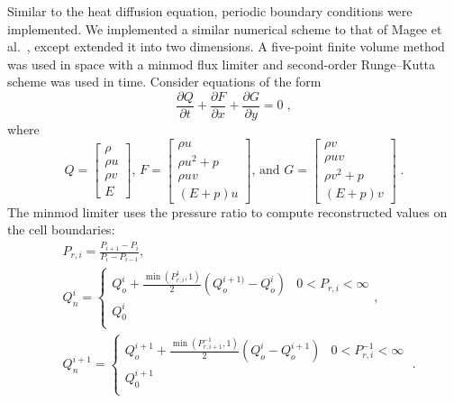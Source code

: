 \documentclass[preprints,article,accept,moreauthors,pdftex]{Definitions/mdpi}
\begin{document}
Similar to the heat diffusion equation, periodic boundary conditions were implemented. 
We implemented a similar numerical scheme to that of Magee et al.~\cite{Magee2018AcceleratingDecomposition}, except extended it into two dimensions. 
A five-point finite volume method was used in space with a minmod flux limiter and second-order Runge--Kutta scheme was used in time. 
Consider equations of the form
\begin{equation*}
    \frac{\partial Q}{\partial t}+\frac{\partial F}{\partial x}+\frac{\partial G}{\partial y} = 0 \;,
\end{equation*}
where
\begin{equation*}
    Q = \begin{bmatrix}
        \rho\\
        \rho u\\
        \rho v\\
        E
        \end{bmatrix}
        \text{, }
    F = \begin{bmatrix}
    \rho u\\
    \rho u^2+p\\
    \rho u v\\
    (E+p)u
    \end{bmatrix}
    \text{, and }
    G = \begin{bmatrix}
    \rho v\\
    \rho u v\\
    \rho v^2+p\\
    (E+p)v
    \end{bmatrix} \;.
\end{equation*}
The minmod limiter uses the pressure ratio to compute reconstructed values on the cell boundaries:
\begin{align*}
   & P_{r,i} = \frac{P_{i+1}-P_{i}}{P_{i}-P_{i-1}},\\
    &Q_n^{i} = \begin{cases} 
      Q_o^{i}+\frac{\min(P_{r,i}^1,1)}{2}(Q_o^{i+1)}-Q_o^{i}) & 0 < P_{r,i} < \infty \\
      Q_0^{i} \\
   \end{cases},\\
    &Q_n^{i+1} = \begin{cases} 
      Q_o^{i+1}+\frac{\min(P_{r,i+1}^{-1},1)}{2}(Q_o^{i}-Q_o^{i+1}) & 0 < P_{r,i}^{-1} < \infty \\
      Q_0^{i+1} \\
   \end{cases} \;.
\end{align*}
\end{document}
